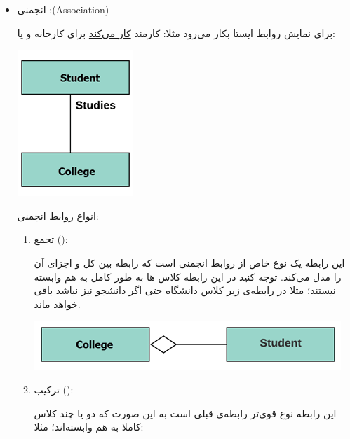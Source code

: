 \documentclass[]{article}
\begin{document}
\begin{itemize}[label=\textcolor{listColor}{$\blacklozenge$}]
\begin{itemize}[label=\textcolor{umlrelcolor}{$\blacksquare$}]
\begin{center}
\end{center}

\newpage

 \item
   {\fehrest \textcolor{umlrelcolor}{انجمنی  :(Association)
 }}


 
 برای نمایش روابط ایستا بکار می‌رود مثلا:  کارمند \underline{کار می‌کند} برای کارخانه و یا:
 
 

    \begin{center}

\includegraphics[]{images/image5.png}

\end{center}
 
 انواع روابط انجمنی: 
 
 \begin{enumerate}

\item
تجمع ():
 
 این رابطه یک نوع خاص از روابط انجمنی است که رابطه بین کل و اجزای آن را مدل می‌کند. توجه کنید در این رابطه کلاس ها به طور کامل به هم وابسته نیستند؛ مثلا 
در رابطه‌ی زیر کلاس دانشگاه حتی اگر دانشجو نیز نباشد باقی خواهد ماند.

\begin{center}


  \includegraphics[]{images/image9.png}
 



\end{center} 
 
 \newpage
 \item
ترکیب ():
 
این رابطه نوع قوی‌تر رابطه‌ی قبلی است به این صورت که دو یا چند کلاس کاملا به هم وابسته‌اند؛ مثلا:



\end{enumerate}
\end{itemize}
\end{itemize}
\end{document}
